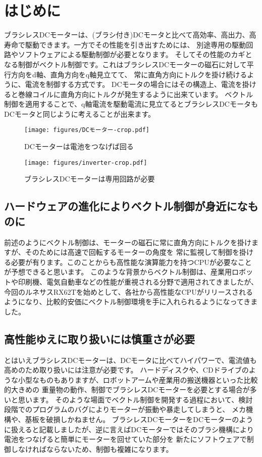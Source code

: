 \section{はじめに}
ブラシレスDCモーターは、(ブラシ付き)DCモータと比べて高効率、高出力、高寿命で駆動できます。一方でその性能を引き出すためには、
別途専用の駆動回路やソフトウェアによる駆動制御が必要となります。
そしてその性能のカギとなる制御がベクトル制御です。これはブラシレスDCモーターの磁石に対して平行方向をd軸、直角方向をq軸見立てて、
常に直角方向にトルクを掛け続けるように、電流を制御する方式です。
DCモータの場合にはその構造上、電流を掛けると巻線コイルに直角方向にトルクが発生するように出来ています。
ベクトル制御を適用することで、q軸電流を駆動電流に見立てるとブラシレスDCモータもDCモータと同じように考えることが出来ます。
\begin{figure}[htbp!]
 \begin{minipage}{0.5\hsize}
  \begin{center}
   \texttt{[image: figures/DCモーター-crop.pdf]}
  \end{center}
  \caption{DCモーターは電池をつなげば回る}
  \label{dcmotor}
 \end{minipage}
 \begin{minipage}{0.5\hsize}
  \begin{center}
   \texttt{[image: figures/inverter-crop.pdf]}
  \end{center}
  \caption{ブラシレスDCモーターは専用回路が必要}
  \label{bldc}
 \end{minipage}
\end{figure}
\subsection{ハードウェアの進化によりベクトル制御が身近になものに}
前述のようにベクトル制御は、モーターの磁石に常に直角方向にトルクを掛けますが、そのためには高速で回転するモーターの角度を
常に監視して制御を掛ける必要が有ります。このことからも高性能な演算能力を持つCPUが必要なことが予想できると思います。
このような背景からベクトル制御は、産業用ロボットや印刷機、電気自動車などの性能が重視される分野で適用されてきましたが、
今回のルネサスRX62Tを始めとして、各社から高性能なCPUがリリースされるようになり、比較的安価にベクトル制御環境を手に入れられるようになってきました。

\subsection{高性能ゆえに取り扱いには慎重さが必要}
とはいえブラシレスDCモーターは、DCモータに比べてハイパワーで、電流値も高めのため取り扱いには注意が必要です。
ハードディスクや、CDドライブのような小型なものもありますが、ロボットアームや産業用の搬送機器といった比較的大きめの
重量物の動作、制御でブラシレスDCモーターを必要とする場合が多いと思います。
そのような場面でベクトル制御を開発する過程において、検討段階でのプログラムのバグによりモーターが振動や暴走してしまうと、
メカ機構や、基板を破損しかねません。
ブラシレスDCモーターをDCモーターのように扱えると記載しましたが、逆に言えばDCモーターではそのブラシ機構により電池をつなげると簡単にモーターを回せていた部分を
新たにソフトウェアで制御しなければならないため、制御も複雑になります。

